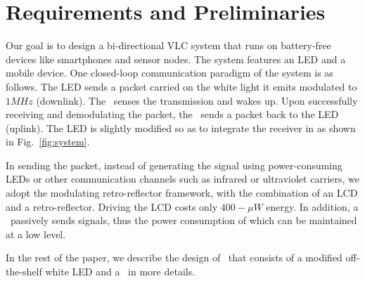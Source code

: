 \section{Requirements and Preliminaries}
\label{sec:background}



Our goal is to design a bi-directional VLC system that runs on battery-free devices like smartphones and sensor nodes. The system features an LED and a mobile device. One closed-loop communication paradigm of the system is as follows. The LED sends a packet carried on the white light it emits modulated to $1MHz$ (downlink). The \vitag\ senses the transmission and wakes up. Upon successfully receiving and demodulating the packet, the \vitag\ sends a packet back to the LED (uplink). The LED is slightly modified so as to integrate the receiver in as shown in Fig.~\ref{fig:system}.

In sending the packet, instead of generating the signal using power-consuming LEDs or other communication channels such as infrared or ultraviolet carriers, we adopt the modulating retro-reflector framework, with the combination of an LCD and a retro-reflector. Driving the LCD costs only $400-\mu W$ energy. In addition, a \vitag\ passively sends signals, thus the power consumption of which can be maintained at a low level. 


In the rest of the paper, we describe the design of \retro\ that consists of a modified off-the-shelf white LED and a \vitag\ in more details.


